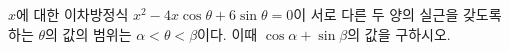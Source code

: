 $x$에 대한 이차방정식 $x^2-4x\cos\theta+6\sin\theta=0$이 서로 다른 두 양의 실근을 갖도록 하는 $\theta$의 값의 범위는 $\alpha<\theta<\beta$이다. 이때 $\cos\alpha+\sin\beta$의 값을 구하시오. \cond{$0\le\theta<2\pi$}
